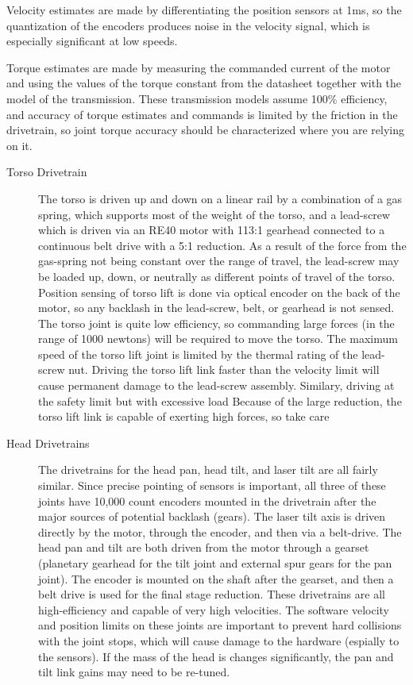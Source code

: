 Velocity estimates are made by differentiating the position sensors at 1ms, so the
quantization of the encoders produces noise in the velocity signal, which is
especially significant at low speeds.

Torque estimates are made by measuring the commanded current of the motor and
using the values of the torque constant from the datasheet together with the
model of the transmission.  These transmission models assume 100\% efficiency,
and accuracy of torque estimates and commands is limited by the friction in the
drivetrain, so joint torque accuracy should be characterized where you are
relying on it.

\begin{description}
\item[Torso Drivetrain] The torso is driven up and down on a linear rail by a
  combination of a gas spring, which supports most of the weight of the torso,
  and a lead-screw which is driven via an RE40 motor with 113:1 gearhead
  connected to a continuous belt drive with a 5:1 reduction.  As a result of the
  force from the gas-spring not being constant over the range of travel, the
  lead-screw may be loaded up, down, or neutrally as different points of travel
  of the torso.  Position sensing of torso lift is done via optical encoder on
  the back of the motor, so any backlash in the lead-screw, belt, or gearhead is
  not sensed.  The torso joint is quite low efficiency, so commanding large
  forces (in the range of 1000 newtons) will be required to move the torso.  The
  maximum speed of the torso lift joint is limited by the thermal rating of the
  lead-screw nut.  Driving the torso lift link faster than the velocity limit
  will cause permanent damage to the lead-screw assembly.  Similary, driving at
  the safety limit but with excessive load Because of the large reduction, the
  torso lift link is capable of exerting high forces, so take care

\item[Head Drivetrains] The drivetrains for the head pan, head tilt, and laser
  tilt are all fairly similar.  Since precise pointing of sensors is important,
  all three of these joints have 10,000 count encoders mounted in the drivetrain
  after the major sources of potential backlash (gears).  The laser tilt axis is
  driven directly by the motor, through the encoder, and then via a belt-drive.
  The head pan and tilt are both driven from the motor through a gearset
  (planetary gearhead for the tilt joint and external spur gears for the pan
  joint).  The encoder is mounted on the shaft after the gearset, and then a
  belt drive is used for the final stage reduction.  These drivetrains are all
  high-efficiency and capable of very high velocities.  The software velocity
  and position limits on these joints are important to prevent hard collisions
  with the joint stops, which will cause damage to the hardware (espially to the
  sensors).  If the mass of the head is changes significantly, the pan and tilt
  link gains may need to be re-tuned.


\end{description}
